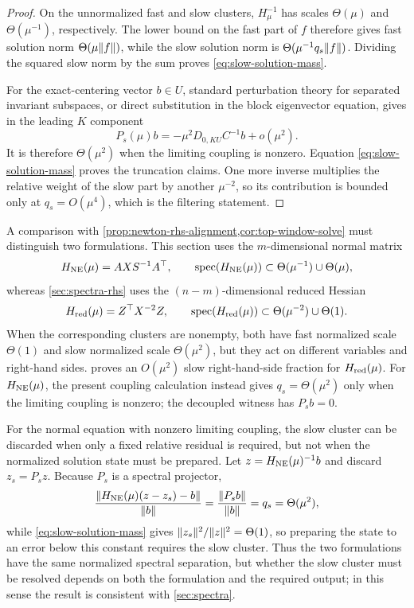 \begin{proof}
On the unnormalized fast and slow clusters, $H_\mu^{-1}$ has scales
$\Theta(\mu)$ and $\Theta(\mu^{-1})$, respectively.  The lower bound on the
fast part of $f$ therefore gives fast solution norm $\Theta(\mu\lVert f\rVert)$,
while the slow solution norm is $\Theta(\mu^{-1}q_s\lVert f\rVert)$.  Dividing the
squared slow norm by the sum proves \eqref{eq:slow-solution-mass}.

For the exact-centering vector $b\in U$, standard perturbation theory for
separated invariant subspaces, or direct substitution in the block
eigenvector equation, gives in the leading $K$ component
\begin{equation}
 P_s(\mu)b=-\mu^2D_{0,KU}C^{-1}b+o(\mu^2).
 \label{eq:exact-center-slow-rhs}
\end{equation}
It is therefore $\Theta(\mu^2)$ when the limiting coupling is nonzero.
Equation \eqref{eq:slow-solution-mass} proves the truncation claims.  One
more inverse multiplies the relative weight of the slow part by another
$\mu^{-2}$, so its contribution is bounded only at
$q_s=O(\mu^4)$, which is the filtering statement.
\end{proof}

A comparison with \cref{prop:newton-rhs-alignment,cor:top-window-solve}
must distinguish two formulations.  This section uses the $m$-dimensional
normal matrix
\[
 H_{\rm NE}(\mu)=AXS^{-1}A^\top,
 \qquad
 \operatorname{spec}(H_{\rm NE}(\mu))
 \subset\Theta(\mu^{-1})\cup\Theta(\mu),
\]
whereas \cref{sec:spectra-rhs} uses the $(n-m)$-dimensional reduced Hessian
\[
 H_{\rm red}(\mu)=Z^\top X^{-2}Z,
 \qquad
 \operatorname{spec}(H_{\rm red}(\mu))
 \subset\Theta(\mu^{-2})\cup\Theta(1).
\]
When the corresponding clusters are nonempty, both have fast normalized
scale $\Theta(1)$ and slow normalized scale $\Theta(\mu^2)$, but they act on
different variables and right-hand sides.   proves an
$O(\mu^2)$ slow right-hand-side fraction for $H_{\rm red}(\mu)$.  For
$H_{\rm NE}(\mu)$, the present coupling calculation
instead gives $q_s=\Theta(\mu^2)$ only when the limiting coupling is nonzero;
the decoupled witness has $P_sb=0$.

For the normal equation with nonzero limiting coupling, the slow cluster can
be discarded when only a fixed relative residual is required, but not when
the normalized solution state must be prepared.  Let
$z=H_{\rm NE}(\mu)^{-1}b$ and discard
$z_s=P_sz$.  Because $P_s$ is a spectral projector,
\begin{equation}
 \frac{\lVert H_{\rm NE}(\mu)(z-z_s)-b\rVert}{\lVert b\rVert}
 =\frac{\lVert P_sb\rVert}{\lVert b\rVert}=q_s=\Theta(\mu^2),
 \label{eq:normal-window-residual}
\end{equation}
while \eqref{eq:slow-solution-mass} gives
$\lVert z_s\rVert^2/\lVert z\rVert^2=\Theta(1)$, so preparing the state to an error
below this constant requires the slow cluster.  Thus the two formulations
have the same normalized spectral separation, but whether the slow cluster
must be resolved depends on both the formulation and the required output;
in this sense the result is consistent with \cref{sec:spectra}.

